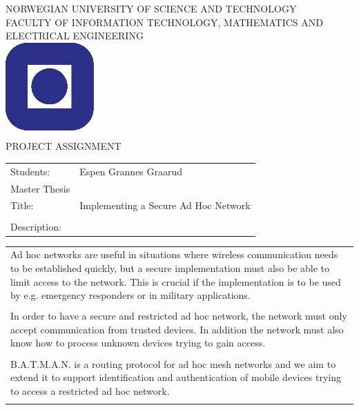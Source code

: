 
%
\begin{titlepage}
\begin{center}
\textsc{NORWEGIAN UNIVERSITY OF SCIENCE AND TECHNOLOGY\\
FACULTY OF  INFORMATION TECHNOLOGY, MATHEMATICS AND ELECTRICAL ENGINEERING} \\
\vspace{0.5cm} 
\includegraphics[scale=0.5]{images/NTNU_logo.png} \\

\vspace{1.0cm}
{\Huge{PROJECT ASSIGNMENT}}
\vspace{1.0cm}

\begin{tabular}{ p{4cm} p{11cm}}

Students:	& Espen Grannes Graarud \\
Master Thesis \\
Title: & Implementing a Secure Ad Hoc Network \\\\
Description: & \\
\end{tabular}
{\small{\begin{tabular}{p{15cm}}
\vspace{0.2cm}
 
Ad hoc networks are useful in situations where wireless communication needs to be established quickly, but a secure implementation must also be able to limit access to the network. This is crucial if the implementation is to be used by e.g. emergency responders or in military applications.
\\\\
In order to have a secure and restricted ad hoc network, the network must only accept communication from trusted devices. In addition the network must also know how to process unknown devices trying to gain access.
\\\\ 
B.A.T.M.A.N. is a routing protocol for ad hoc mesh networks and we aim to extend it to support identification and authentication of mobile devices trying to access a restricted ad hoc network.
\\\\


\end{tabular}}}
\end{center}
\end{titlepage}
